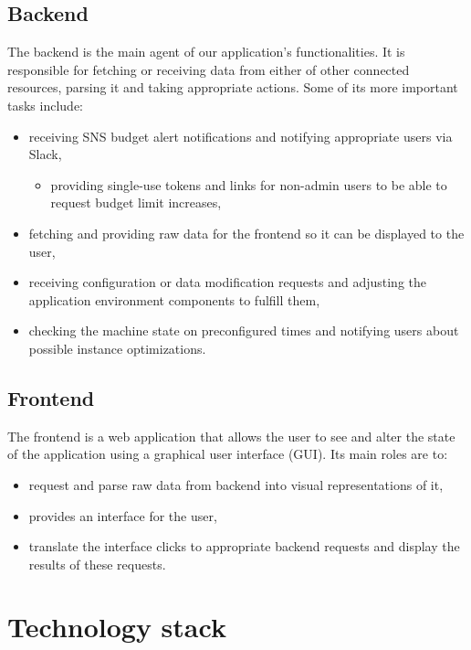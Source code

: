 \documentclass[licencjacka,en]{thesisclass}
\begin{document}
    \subsection{Backend}

    The backend is the main agent of our application's functionalities.
    It is responsible for fetching or receiving data from either
    of other connected resources, parsing it and taking appropriate actions.
    Some of its more important tasks include:
    \begin{itemize}
        \item receiving SNS budget alert notifications
          and notifying appropriate users via Slack,
        \begin{itemize}
            \item providing single-use tokens and links
              for non-admin users to be able to request budget limit increases,
        \end{itemize}
        \item fetching and providing raw data for the frontend
          so it can be displayed to the user,
        \item receiving configuration or data modification requests
          and adjusting the application environment components to fulfill them,
        \item checking the machine state on preconfigured times
          and notifying users about possible instance optimizations.
    \end{itemize}

    \subsection{Frontend}
    The frontend is a web application that allows the user to see
    and alter the state of the application using a graphical user interface (GUI).
    Its main roles are to:
    \begin{itemize}
        \item request and parse raw data from backend into visual representations of it,
        \item provides an interface for the user,
        \item translate the interface clicks to appropriate backend requests
          and display the results of these requests.
    \end{itemize}

    \section{Technology stack}
\end{document}
